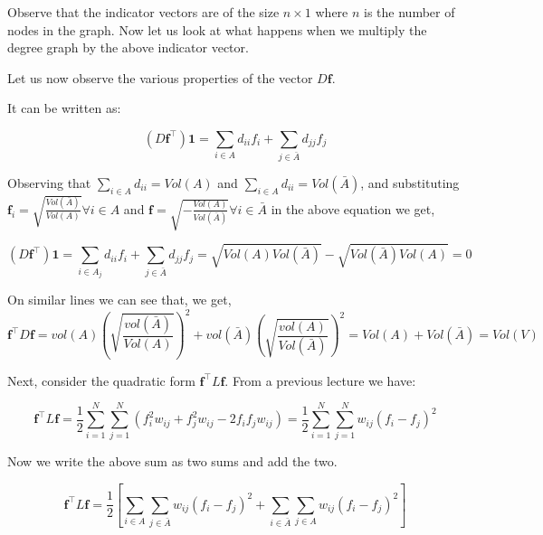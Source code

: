 \documentclass[english]{article}
\theoremstyle{plain}
\begin{document}
Observe that the indicator vectors are of the size $n \times 1$ where $n$ is the number of nodes in the graph. Now let us look at what happens when we multiply the degree graph by the above indicator vector.

Let us now observe the various properties of the vector $D\boldsymbol{f}$.

It can be written as:

\begin{equation}
\left(D\boldsymbol{f}^{\top}\right)\boldsymbol{1} =\sum_{i\in A} d_{ii}f_{i} + \sum_{j \in \bar{A}} d_{jj}f_{j}
\end{equation}

Observing that $\sum_{i\in A} d_{ii}=Vol(A)$ and $\sum_{i\in A} d_{ii}=Vol(\bar{A})$, and substituting $\boldsymbol{f}_{i} = \sqrt{\frac{Vol(\bar{A})}{Vol(A)}} \forall i \in A$ and $\boldsymbol{f} = \sqrt{-\frac{Vol(A)}{Vol(\bar{A})}} \forall i \in \bar{A}$ in the above equation we get,

\begin{equation}
\left(D\boldsymbol{f}^{\top}\right)\boldsymbol{1} =\sum_{i\in A_{j}} d_{ii}f_{i} + \sum_{j \in \bar{A}} d_{jj}f_{j} = \sqrt{Vol(A)Vol(\bar{A})}-\sqrt{Vol(\bar{A})Vol(A)} = 0
\end{equation}

On similar lines we can see that, we get,
\begin{equation}
\boldsymbol{f}^{\top}D\boldsymbol{f} = vol(A)\left(\sqrt{\frac{vol(\bar{A})}{Vol(A)}}\right)^{2} + vol(\bar{A})\left(\sqrt{\frac{vol(A)}{Vol(\bar{A})}}\right)^{2} = Vol(A) + Vol(\bar{A}) = Vol(V)
\end{equation}

Next, consider the quadratic form $\boldsymbol{f}^{\top}L\boldsymbol{f}$. From a previous lecture we have:

\begin{equation}
\boldsymbol{f}^{\top}L\boldsymbol{f} = 
\frac{1}{2}\sum_{i=1}^{N} \sum_{j=1}^{N} \left( f^{2}_{i} w_{ij} + f^{2}_{j} w_{ij} - 2f_{i}f_{j} w_{ij} \right) = \frac{1}{2}\sum_{i=1}^{N} \sum_{j=1}^{N}  w_{ij}\left( f_{i} - f_{j} \right)^{2}
\end{equation}

Now we write the above sum as two sums and add the two.

\begin{equation}
\boldsymbol{f}^{\top}L\boldsymbol{f} = \frac{1}{2} \left[ \sum_{i \in A} \sum_{j \in \bar{A}}  w_{ij}\left( f_{i} - f_{j} \right)^{2} + \sum_{i \in \bar{A}} \sum_{j \in A}  w_{ij}\left( f_{i} - f_{j} \right)^{2}  \right]
\end{equation}
\end{document}
